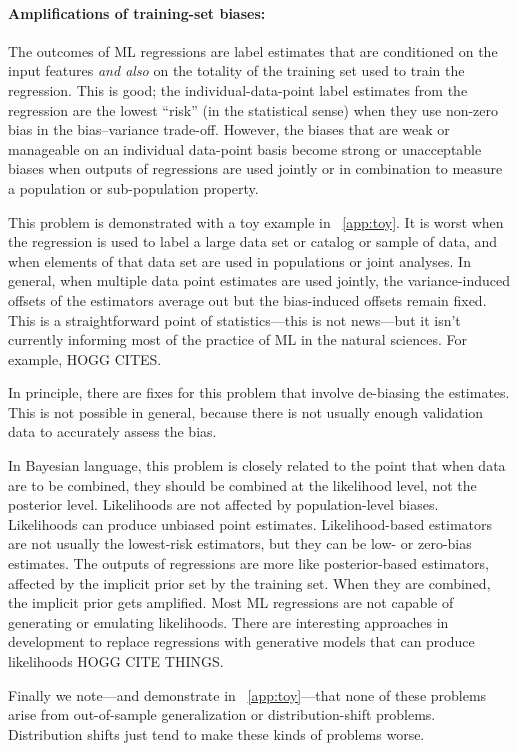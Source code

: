 \documentclass[10pt]{article}
\begin{document}
\paragraph{Amplifications of training-set biases:}
The outcomes of ML regressions are label estimates that are conditioned on the input features \emph{and also} on the totality of the training set used to train the regression.
This is good; the individual-data-point label estimates from the regression are the lowest ``risk'' (in the statistical sense) when they use non-zero bias in the bias--variance trade-off.
However, the biases that are weak or manageable on an individual data-point basis become strong or unacceptable biases when outputs of regressions are used jointly or in combination to measure a population or sub-population property.

This problem is demonstrated with a toy example in \appendixname~\ref{app:toy}.
It is worst when the regression is used to label a large data set or catalog or sample of data,
and when elements of that data set are used in populations or joint analyses.
In general, when multiple data point estimates are used jointly, the variance-induced offsets of the estimators average out but the bias-induced offsets remain fixed.
This is a straightforward point of statistics---this is not news---but it isn't currently informing most of the practice of ML in the natural sciences.
For example, HOGG CITES.

In principle, there are fixes for this problem that involve de-biasing the estimates.
This is not possible in general, because there is not usually enough validation data to accurately assess the bias.

In Bayesian language, this problem is closely related to the point that when data are to be combined, they should be combined at the likelihood level, not the posterior level.
Likelihoods are not affected by population-level biases.
Likelihoods can produce unbiased point estimates.
Likelihood-based estimators are not usually the lowest-risk estimators, but they can be low- or zero-bias estimates.
The outputs of regressions are more like posterior-based estimators, affected by the implicit prior set by the training set.
When they are combined, the implicit prior gets amplified.
Most ML regressions are not capable of generating or emulating likelihoods.
There are interesting approaches in development to replace regressions with generative models that can produce likelihoods HOGG CITE THINGS.

Finally we note---and demonstrate in \appendixname~\ref{app:toy}---that none of these problems arise from out-of-sample generalization or distribution-shift problems.
Distribution shifts just tend to make these kinds of problems worse.
\end{document}
